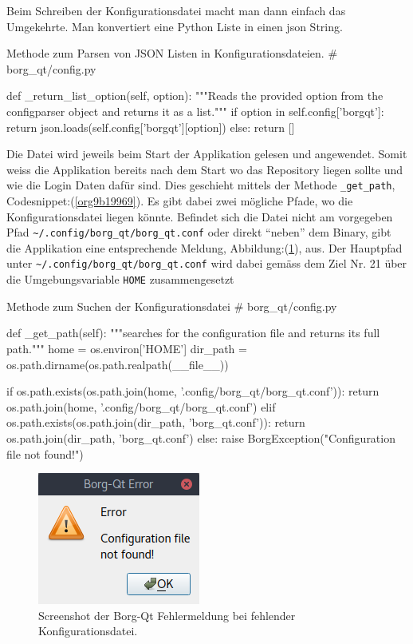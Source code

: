 Beim Schreiben der Konfigurationsdatei macht man dann einfach das Umgekehrte.
Man konvertiert eine Python Liste in einen \gls{json} String.

\begin{sexylisting}[label=orgd4f11c4]{Methode zum Parsen von JSON Listen in Konfigurationsdateien.}
# borg_qt/config.py

def _return_list_option(self, option):
    """Reads the provided option from the configparser object and returns
    it as a list."""
    if option in self.config['borgqt']:
        return json.loads(self.config['borgqt'][option])
    else:
        return []
\end{sexylisting}

Die Datei wird jeweils beim Start der Applikation gelesen und angewendet. Somit
weiss die Applikation bereits nach dem Start wo das Repository liegen sollte
und wie die Login Daten dafür sind. Dies geschieht mittels der Methode
\texttt{\_get\_path}, Codesnippet:(\ref{org9b19969}). Es gibt dabei zwei mögliche Pfade,
wo die Konfigurationsdatei liegen könnte. Befindet sich die Datei nicht am
vorgegeben Pfad \texttt{\textasciitilde{}/.config/borg\_qt/borg\_qt.conf} oder direkt "`neben"' dem
Binary, gibt die Applikation eine entsprechende Meldung,
Abbildung:(\ref{fig:orgb4e2c3c}), aus. Der Hauptpfad unter
\texttt{\textasciitilde{}/.config/borg\_qt/borg\_qt.conf} wird dabei gemäss dem Ziel Nr. 21 über die
Umgebungsvariable \texttt{HOME} zusammengesetzt

\begin{sexylisting}[label=org9b19969]{Methode zum Suchen der Konfigurationsdatei}
# borg_qt/config.py

def _get_path(self):
    """searches for the configuration file and returns its full path."""
    home = os.environ['HOME']
    dir_path = os.path.dirname(os.path.realpath(__file__))

    if os.path.exists(os.path.join(home, '.config/borg_qt/borg_qt.conf')):
        return os.path.join(home, '.config/borg_qt/borg_qt.conf')
    elif os.path.exists(os.path.join(dir_path, 'borg_qt.conf')):
        return os.path.join(dir_path, 'borg_qt.conf')
    else:
        raise BorgException("Configuration file not found!")
\end{sexylisting}

\begin{figure}[H]
\centering
\includegraphics[width=.3\textwidth]{pictures/borgqt_missing_config.png}
\caption{\label{fig:orgb4e2c3c}
Screenshot der Borg-Qt Fehlermeldung bei fehlender Konfigurationsdatei.}
\end{figure}

